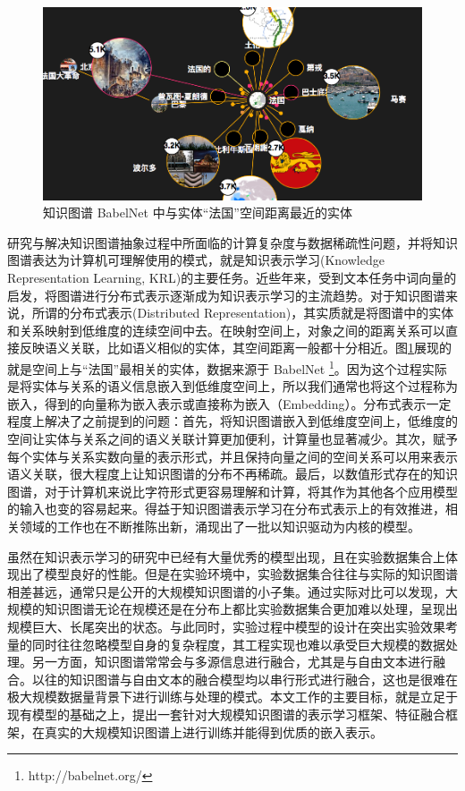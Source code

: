 \vspace{25pt}
\begin{figure}[h]
\setlength{\abovecaptionskip}{30pt} 
\centering
\includegraphics[width=0.9\columnwidth]{figures/ch1/space.png}
\caption{知识图谱 BabelNet 中与实体``法国''空间距离最近的实体}
\label{ch1:space}
\end{figure}

研究与解决知识图谱抽象过程中所面临的计算复杂度与数据稀疏性问题，并将知识图谱表达为计算机可理解使用的模式，就是知识表示学习(Knowledge Representation Learning, KRL)的主要任务。近些年来，受到文本任务中词向量的启发，将图谱进行分布式表示逐渐成为知识表示学习的主流趋势。对于知识图谱来说，所谓的分布式表示(Distributed Representation)，其实质就是将图谱中的实体和关系映射到低维度的连续空间中去。在映射空间上，对象之间的距离关系可以直接反映语义关联，比如语义相似的实体，其空间距离一般都十分相近。图\ref{ch1:space}展现的就是空间上与``法国''最相关的实体，数据来源于 BabelNet \footnote{http://babelnet.org/}。因为这个过程实际是将实体与关系的语义信息嵌入到低维度空间上，所以我们通常也将这个过程称为嵌入，得到的向量称为嵌入表示或直接称为嵌入（Embedding）。分布式表示一定程度上解决了之前提到的问题：首先，将知识图谱嵌入到低维度空间上，低维度的空间让实体与关系之间的语义关联计算更加便利，计算量也显著减少。其次，赋予每个实体与关系实数向量的表示形式，并且保持向量之间的空间关系可以用来表示语义关联，很大程度上让知识图谱的分布不再稀疏。最后，以数值形式存在的知识图谱，对于计算机来说比字符形式更容易理解和计算，将其作为其他各个应用模型的输入也变的容易起来。得益于知识图谱表示学习在分布式表示上的有效推进，相关领域的工作也在不断推陈出新，涌现出了一批以知识驱动为内核的模型。

虽然在知识表示学习的研究中已经有大量优秀的模型出现，且在实验数据集合上体现出了模型良好的性能。但是在实验环境中，实验数据集合往往与实际的知识图谱相差甚远，通常只是公开的大规模知识图谱的小子集。通过实际对比可以发现，大规模的知识图谱无论在规模还是在分布上都比实验数据集合更加难以处理，呈现出规模巨大、长尾突出的状态。与此同时，实验过程中模型的设计在突出实验效果考量的同时往往忽略模型自身的复杂程度，其工程实现也难以承受巨大规模的数据处理。另一方面，知识图谱常常会与多源信息进行融合，尤其是与自由文本进行融合。以往的知识图谱与自由文本的融合模型均以串行形式进行融合，这也是很难在极大规模数据量背景下进行训练与处理的模式。本文工作的主要目标，就是立足于现有模型的基础之上，提出一套针对大规模知识图谱的表示学习框架、特征融合框架，在真实的大规模知识图谱上进行训练并能得到优质的嵌入表示。

